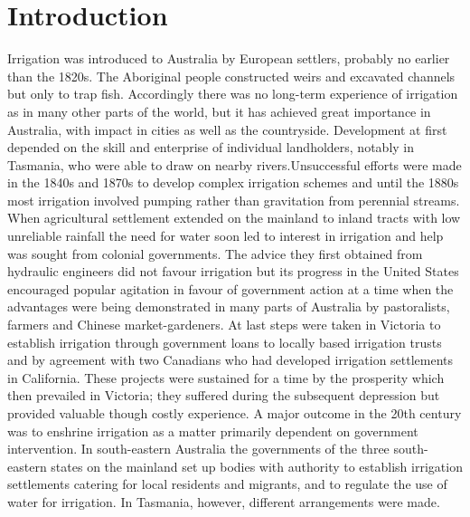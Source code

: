 
\chapter{Introduction}

Irrigation was introduced to Australia by European settlers, probably
no earlier than the 1820s. The Aboriginal people constructed weirs and
excavated channels but only to trap fish. Accordingly there was no
long-term experience of irrigation as in many other parts of the
world, but it has achieved great importance in Australia, with impact
in cities as well as the countryside. Development at first depended on
the skill and enterprise of individual landholders, notably in
Tasmania, who were able to draw on nearby rivers.Unsuccessful efforts
were made in the 1840s and 1870s to develop complex irrigation schemes
and until the 1880s most irrigation involved pumping rather than
gravitation from perennial streams. When agricultural settlement
extended on the mainland to inland tracts with low unreliable rainfall
the need for water soon led to interest in irrigation and help was
sought from colonial governments. The advice they first obtained from
hydraulic engineers did not favour irrigation but its progress in the
United States encouraged popular agitation in favour of government
action at a time when the advantages were being demonstrated in many
parts of Australia by pastoralists, farmers and Chinese
market-gardeners. At last steps were taken in Victoria to establish
irrigation through government loans to locally based irrigation trusts
and by agreement with two Canadians who had developed irrigation
settlements in California. These projects were sustained for a time by
the prosperity which then prevailed in Victoria; they suffered during
the subsequent depression but provided valuable though costly
experience. A major outcome in the 20th century was to enshrine
irrigation as a matter primarily dependent on government
intervention. In south-eastern Australia the governments of the three
south-eastern states on the mainland set up bodies with authority to
establish irrigation settlements catering for local residents and
migrants, and to regulate the use of water for irrigation.  In
Tasmania, however, different arrangements were made.

